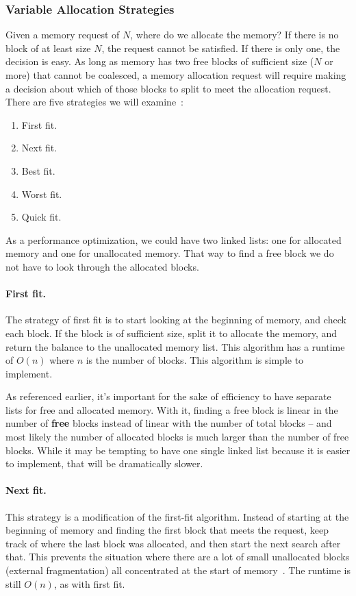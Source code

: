 \subsubsection*{Variable Allocation Strategies}

Given a memory request of $N$, where do we allocate the memory? If there is no block of at least size $N$, the request cannot be satisfied. If there is only one, the decision is easy. As long as memory has two free blocks of sufficient size ($N$ or more) that cannot be coalesced, a memory allocation request will require making a decision about which of those blocks to split to meet the allocation request. There are five strategies we will examine~\cite{mte241}:

\begin{enumerate}
	\item First fit.
	\item Next fit.
	\item Best fit.
	\item Worst fit.
	\item Quick fit.
\end{enumerate}

As a performance optimization, we could have two linked lists: one for allocated memory and one for unallocated memory. That way to find a free block we do not have to look through the allocated blocks.

\paragraph{First fit.} The strategy of first fit is to start looking at the beginning of memory, and check each block. If the block is of sufficient size, split it to allocate the memory, and return the balance to the unallocated memory list. This algorithm has a runtime of $O(n)$ where $n$ is the number of blocks. This algorithm is simple to implement. 

As referenced earlier, it's important for the sake of efficiency to have separate lists for free and allocated memory. With it, finding a free block is linear in the number of \textbf{free} blocks instead of linear with the number of total blocks -- and most likely the number of allocated blocks is much larger than the number of free blocks. While it may be tempting to have one single linked list because it is easier to implement, that will be dramatically slower.

\paragraph{Next fit.} This strategy is a modification of the first-fit algorithm. Instead of starting at the beginning of memory and finding the first block that meets the request, keep track of where the last block was allocated, and then start the next search after that. This prevents the situation where there are a lot of small unallocated blocks (external fragmentation) all concentrated at the start of memory~\cite{mte241}. The runtime is still $O(n)$, as with first fit.

